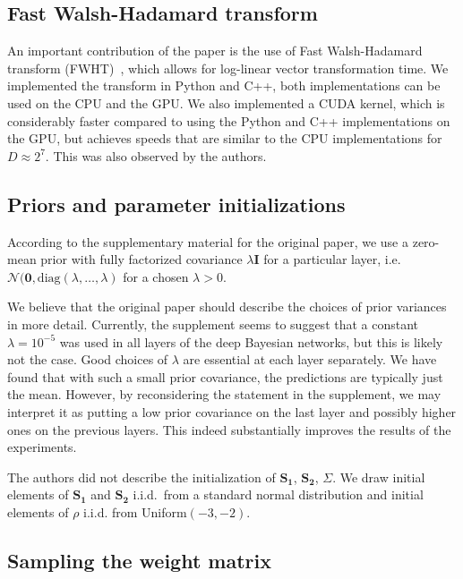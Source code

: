 \documentclass[11pt]{article}
\begin{document}
    \subsection{Fast Walsh-Hadamard transform}
    An important contribution of the paper is the use of Fast Walsh-Hadamard transform (FWHT)~\cite{fino1976unified}, which allows for log-linear vector transformation time.
    We implemented the transform in Python and C++, both implementations can be used on the CPU and the GPU.
    We also implemented a CUDA kernel, which is considerably faster compared to using the Python and C++ implementations on the GPU, but achieves speeds that are similar to the CPU implementations for $D \approx 2^7$.
    This was also observed by the authors.

    \subsection{Priors and parameter initializations}
    According to the supplementary material for the original paper, we use a zero-mean prior with fully factorized covariance $\lambda \mathbf{I}$ for a particular layer, i.e. $\mathcal{N}(\mathbf{0}, \mathrm{diag}(\lambda, \dots, \lambda)$ for a chosen $\lambda > 0$.

    We believe that the original paper should describe the choices of prior variances in more detail.
    Currently, the supplement seems to suggest that a constant $\lambda = 10^{-5}$ was used in all layers of the deep Bayesian networks, but this is likely not the case.
    Good choices of $\lambda$ are essential at each layer separately.
    We have found that with such a small prior covariance, the predictions are typically just the mean.
    However, by reconsidering the statement in the supplement, we may interpret it as putting a low prior covariance on the last layer and possibly higher ones on the previous layers.
    This indeed substantially improves the results of the experiments.

    The authors did not describe the initialization of $\mathbf{S_1}$, $\mathbf{S_2}$, $\Sigma$.
    We draw initial elements of $\mathbf{S_1}$ and $\mathbf{S_2}$ i.i.d.\ from a standard normal distribution and initial elements of $\rho$ i.i.d. from Uniform$(-3, -2)$.


    \subsection{Sampling the weight matrix}\label{subsec:sampling-the-weight-matrix}
\end{document}
